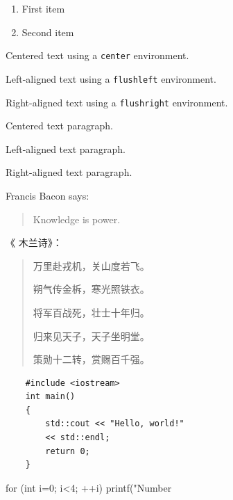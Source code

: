 \documentclass[UTF8]{ctexart}
\begin{document}
	\renewcommand{\labelenumi}%
	{\Alph{enumi}>}
	\begin{enumerate}
		\item First item
		\item Second item
	\end{enumerate}

	\begin{center}
		Centered text using a
		\verb|center| environment.
	\end{center}


	\begin{flushleft}
		Left-aligned text using a
		\verb|flushleft| environment.
	\end{flushleft}

	\begin{flushright}
		Right-aligned text using a
		\verb|flushright| environment.
	\end{flushright}


	\centering
	Centered text paragraph.

	\raggedright
	Left-aligned text paragraph.

	\raggedleft
	Right-aligned text paragraph.


	Francis Bacon says:
	\begin{quote}
		Knowledge is power.
	\end{quote}

	《 木兰诗》：

	\begin{quotation}
		万里赴戎机，关山度若飞。

		朔气传金柝，寒光照铁衣。

		将军百战死，壮士十年归。

		归来见天子，天子坐明堂。

		策勋十二转，赏赐百千强。
	\end{quotation}


	\begin{verbatim}
	#include <iostream>
	int main()
	{
		std::cout << "Hello, world!"
		<< std::endl;
		return 0;
	}
	\end{verbatim}


	\begin{verbatim*}
		for (int i=0; i<4; ++i)
		printf("Number %
	\end{verbatim*}
\end{document}
